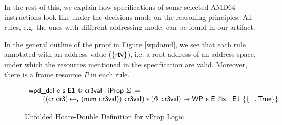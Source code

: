 In the rest of this, we explain how specifications of some selected \textsf{AMD64} instructions look like under the decisions made on the reasoning principles. All rules, e.g. the ones with different addressing mode, can be found in our artifact.

In the general outline of the proof in Figure \ref{wpdamd}, we see that each rule annotated with an address value ($\{\textsf{rtv}\}$), i.e. a root address of an address-space, under which the resources mentioned in the specification are valid. Moreover, there is a frame resource $P$ in each rule.
\begin{figure} 
  \[
  \begin{array}{l}
    \textsf{wpd\_def e s E1 } \Phi \;\mathsf{ cr3val } : \textsf{iProp }\Sigma := \\
   \qquad ((\textsf{cr cr3}) \mapsto_{\textsf{r}} (\textsf{num cr3val)}) \textsf{ cr3val}) \ast (\Phi \textsf{ cr3val}) \mathrel{-\!\!*} \textsf{WP e E } @ \textsf{s ; E1 } \{\{\_, \textsf{True} \}\}
    \end{array}
  \]
\caption{Unfolded Hoare-Double Definition for \textsf{vProp} Logic }
\label{fig:wpddefinition}
\end{figure}

